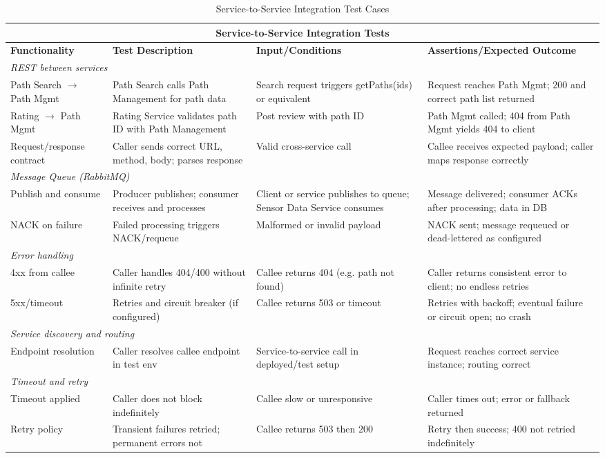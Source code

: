 \begin{table}[ht]
\centering
\begin{tabular}{|p{3cm}|p{3.6cm}|p{3cm}|p{4.4cm}|}
\hline
\multicolumn{4}{|c|}{\textbf{Service-to-Service Integration Tests}} \\ 
\hline
\textbf{Functionality} & \textbf{Test Description} & \textbf{Input/Conditions} & \textbf{Assertions/Expected Outcome} \\
\hline
\multicolumn{4}{|l|}{\textit{REST between services}} \\
\hline
Path Search $\to$ Path Mgmt
 & Path Search calls Path Management for path data
 & Search request triggers getPaths(ids) or equivalent
 & Request reaches Path Mgmt; 200 and correct path list returned \\ \hline
Rating $\to$ Path Mgmt
 & Rating Service validates path ID with Path Management
 & Post review with path ID
 & Path Mgmt called; 404 from Path Mgmt yields 404 to client \\ \hline
Request/response contract
 & Caller sends correct URL, method, body; parses response
 & Valid cross-service call
 & Callee receives expected payload; caller maps response correctly \\
\hline
\multicolumn{4}{|l|}{\textit{Message Queue (RabbitMQ)}} \\
\hline
Publish and consume
 & Producer publishes; consumer receives and processes
 & Client or service publishes to queue; Sensor Data Service consumes
 & Message delivered; consumer ACKs after processing; data in DB \\ \hline
NACK on failure
 & Failed processing triggers NACK/requeue
 & Malformed or invalid payload
 & NACK sent; message requeued or dead-lettered as configured \\ \hline
\multicolumn{4}{|l|}{\textit{Error handling}} \\
\hline
4xx from callee
 & Caller handles 404/400 without infinite retry
 & Callee returns 404 (e.g. path not found)
 & Caller returns consistent error to client; no endless retries \\ \hline
5xx/timeout
 & Retries and circuit breaker (if configured)
 & Callee returns 503 or timeout
 & Retries with backoff; eventual failure or circuit open; no crash \\
\hline
\multicolumn{4}{|l|}{\textit{Service discovery and routing}} \\
\hline
Endpoint resolution
 & Caller resolves callee endpoint in test env
 & Service-to-service call in deployed/test setup
 & Request reaches correct service instance; routing correct \\ \hline
\multicolumn{4}{|l|}{\textit{Timeout and retry}} \\
\hline
Timeout applied
 & Caller does not block indefinitely
 & Callee slow or unresponsive
 & Caller times out; error or fallback returned \\ \hline
Retry policy
 & Transient failures retried; permanent errors not
 & Callee returns 503 then 200
 & Retry then success; 400 not retried indefinitely \\
\hline
\end{tabular}
\caption{Service-to-Service Integration Test Cases}
\label{tab:test_cases_service_to_service}
\end{table}
